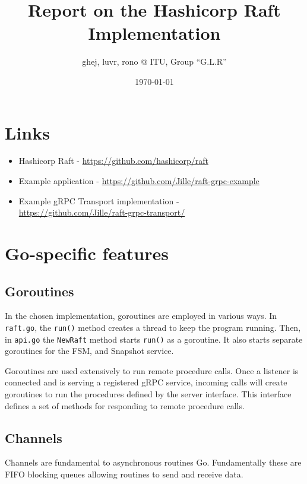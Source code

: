 \documentclass[a4paper,11pt]{article}
\title{Report on the Hashicorp Raft Implementation}
\author{ghej, luvr, rono @ ITU, Group ``G.L.R''}
\date{\today}
\begin{document}
\maketitle

\tableofcontents

\section*{Links}
\begin{itemize}
\item Hashicorp Raft - \url{https://github.com/hashicorp/raft}
\item Example application - \url{https://github.com/Jille/raft-grpc-example}
\item Example gRPC Transport implementation - \\\url{https://github.com/Jille/raft-grpc-transport/}
\end{itemize}

\pagebreak


\section{Go-specific features}
\subsection{Goroutines}
In the chosen implementation, goroutines are employed in various ways. In \texttt{raft.go}, the \texttt{run()} method creates a thread to keep the program running. Then, in \texttt{api.go} the \texttt{NewRaft} method starts \texttt{run()} as a goroutine. It also starts separate goroutines for the FSM, and Snapshot service.

\bigbreak \noindent Goroutines are used extensively to run remote procedure calls. Once a listener is connected and is serving a registered gRPC service, incoming calls will create goroutines to run the procedures defined by the server interface. This interface defines a set of methods for responding to remote procedure calls. 

\subsection{Channels}
Channels are fundamental to asynchronous routines Go. Fundamentally these are FIFO blocking queues allowing routines to send and receive data. 
\end{document}
